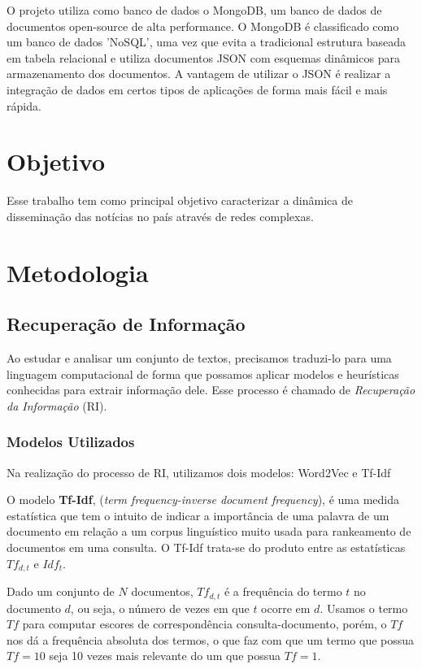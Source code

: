 \documentclass[a4paper,12pt]{article}
\begin{document}
O projeto utiliza como banco de dados o MongoDB, um banco de dados de documentos open-source de alta performance. O MongoDB é classificado como um banco de 
dados 'NoSQL', uma vez que evita a tradicional estrutura  baseada em tabela relacional e utiliza documentos JSON com esquemas dinâmicos para armazenamento 
dos documentos. A vantagem de utilizar o JSON é realizar a integração de dados em certos tipos de aplicações de forma mais fácil e mais rápida.

\section{Objetivo}

Esse trabalho tem como principal objetivo caracterizar a dinâmica de disseminação das notícias no país através de redes complexas.

\section{Metodologia}

\subsection{Recuperação de Informação}

  Ao estudar e analisar um conjunto de textos, precisamos traduzi-lo para uma linguagem computacional de forma que possamos aplicar modelos e heurísticas 
  conhecidas para extrair informação dele. Esse processo é chamado de \textit{Recuperação da Informação} (RI).
    
  
\subsubsection{Modelos Utilizados}

  Na realização do processo de RI, utilizamos dois modelos: Word2Vec e Tf-Idf
  
  O modelo \textbf{Tf-Idf}, (\textit{term frequency-inverse document frequency}), é uma medida estatística que tem o intuito de indicar
  a importância de uma palavra de um documento em relação a um corpus linguístico muito usada para rankeamento de documentos em uma consulta. O Tf-Idf trata-se do produto entre as estatísticas $Tf_{d,t}$ e
  $Idf_{t}$.
  
  Dado um conjunto de $N$ documentos, $Tf_{d,t}$ é a frequência do termo $t$ no documento
  $d$, ou seja, o número de vezes em que $t$ ocorre em $d$. Usamos o termo $Tf$ para computar escores de correspondência consulta-documento,
  porém, o $Tf$ nos dá a frequência absoluta dos termos, o que faz com que um termo que possua $Tf=10$ seja 10 vezes mais relevante do um que possua
  $Tf=1$. 
  
\end{document}
